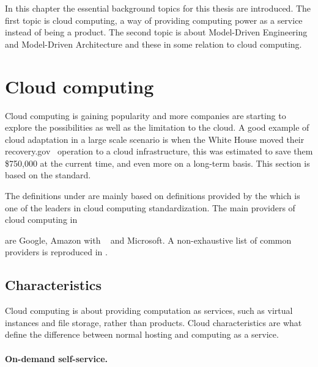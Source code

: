 
In this chapter the essential background topics for this thesis are introduced.
The first topic is cloud computing, a way of providing computing power as a service
instead of being a product.
The second topic is about Model-Driven Engineering and Model-Driven Architecture
and these in some relation to cloud computing.

\section{Cloud computing}


Cloud computing is gaining popularity and more companies are starting 
to explore the possibilities as well as the limitation to the cloud.
A good example of cloud adaptation in a large scale scenario is when
the White House moved their recovery.gov~\cite{recovery} operation to
a cloud infrastructure, this was estimated to save them \$750,000
at the current time, and even more on a long-term basis.
This section is based on the  standard.

The definitions under are mainly based on definitions provided by 
the  which is one of the leaders in cloud computing standardization.
The main providers of cloud computing in \date{April 2012}
are Google, Amazon with ~\cite{aws} and Microsoft.
A non-exhaustive list of common providers is reproduced in .

\subsection{Characteristics}

Cloud computing is about providing computation as services\cite{nist:mell11}, 
such as virtual instances and file storage, rather than products. 
Cloud characteristics are what define
the difference between normal hosting and computing as a service.

\paragraph{On-demand self-service.} 

